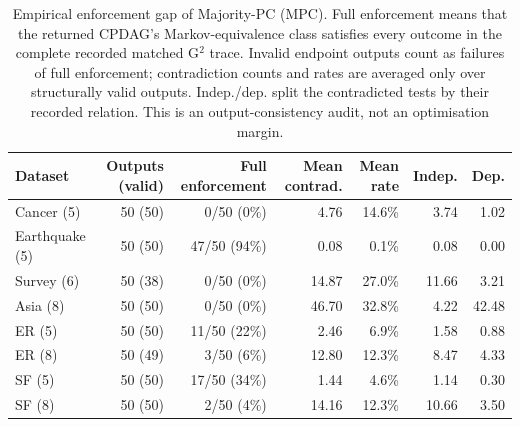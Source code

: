 \begin{table}[t]
\centering
\small
\caption{Empirical enforcement gap of Majority-PC (MPC). Full enforcement means that the returned CPDAG's Markov-equivalence class satisfies every outcome in the complete recorded matched G$^2$ trace. Invalid endpoint outputs count as failures of full enforcement; contradiction counts and rates are averaged only over structurally valid outputs. Indep./dep. split the contradicted tests by their recorded relation. This is an output-consistency audit, not an optimisation margin.}
\label{tab:mpc-enforcement-gap}
\begin{tabular}{lrrrrrr}
\toprule
Dataset & Outputs (valid) & Full enforcement & Mean contrad. & Mean rate & Indep. & Dep. \\
\midrule
Cancer (5) & 50 (50) & 0/50 (0\%) & 4.76 & 14.6\% & 3.74 & 1.02 \\
Earthquake (5) & 50 (50) & 47/50 (94\%) & 0.08 & 0.1\% & 0.08 & 0.00 \\
Survey (6) & 50 (38) & 0/50 (0\%) & 14.87 & 27.0\% & 11.66 & 3.21 \\
Asia (8) & 50 (50) & 0/50 (0\%) & 46.70 & 32.8\% & 4.22 & 42.48 \\
ER (5) & 50 (50) & 11/50 (22\%) & 2.46 & 6.9\% & 1.58 & 0.88 \\
ER (8) & 50 (49) & 3/50 (6\%) & 12.80 & 12.3\% & 8.47 & 4.33 \\
SF (5) & 50 (50) & 17/50 (34\%) & 1.44 & 4.6\% & 1.14 & 0.30 \\
SF (8) & 50 (50) & 2/50 (4\%) & 14.16 & 12.3\% & 10.66 & 3.50 \\
\bottomrule
\end{tabular}
\end{table}
